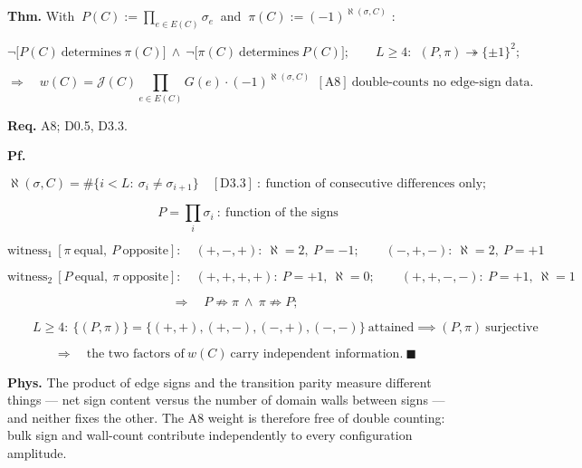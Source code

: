 \begin{theorem}\label{tag:CT0-10}
\textbf{Thm.} With $\ P(C):=\prod_{e\in E(C)}\sigma_e\ $ and $\ \pi(C):=(-1)^{\aleph(\sigma,C)}$ :

\[
\neg\bigl[P(C)\ \text{determines}\ \pi(C)\bigr]\ \wedge\ \neg\bigl[\pi(C)\ \text{determines}\ P(C)\bigr];\qquad
L\ge4:\ \ (P,\pi)\twoheadrightarrow\{\pm1\}^2;
\]

\[
\Longrightarrow\quad w(C)=\mathcal J(C)\prod_{e\in E(C)}G(e)\cdot(-1)^{\aleph(\sigma,C)}\ \ [\mathrm{A8}]\ \text{double-counts no edge-sign data}.
\]

\textbf{Req.} A8; D0.5, D3.3.

\textbf{Pf.}

\[
\aleph(\sigma,C)=\#\{i<L:\ \sigma_i\ne\sigma_{i+1}\}\quad[\mathrm{D3.3}]\ :\ \text{function of consecutive differences only};
\]

\[
\qquad P=\prod_{i}\sigma_i\ :\ \text{function of the signs}
\]

\[
\text{witness}_1\ [\pi\ \text{equal},\ P\ \text{opposite}]:\quad(+,-,+):\ \aleph=2,\ P=-1;\qquad(-,+,-):\ \aleph=2,\ P=+1
\]

\[
\text{witness}_2\ [P\ \text{equal},\ \pi\ \text{opposite}]:\quad(+,+,+,+):\ P=+1,\ \aleph=0;\qquad(+,+,-,-):\ P=+1,\ \aleph=1
\]

\[
\Longrightarrow\quad P\not\Rightarrow\pi\ \wedge\ \pi\not\Rightarrow P;
\]

\[
\qquad L\ge4:\ \{(P,\pi)\}=\{(+,+),(+,-),(-,+),(-,-)\}\ \text{attained}\implies(P,\pi)\ \text{surjective}
\]

\[
\Longrightarrow\quad\text{the two factors of}\ w(C)\ \text{carry independent information}.\ \blacksquare
\]

\textbf{Phys.} The product of edge signs and the transition parity measure different things — net sign content versus the number of domain walls between signs — and neither fixes the other. The A8 weight is therefore free of double counting: bulk sign and wall-count contribute independently to every configuration amplitude.

\end{theorem}

